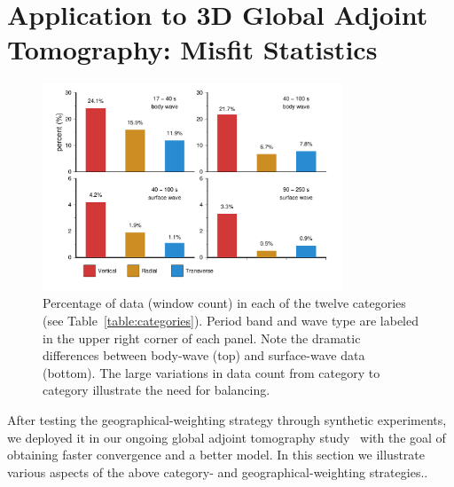 \section{Application to 3D Global Adjoint Tomography: Misfit Statistics}

\begin{figure}
\centering
\includegraphics[width=0.8\textwidth]{ch-weighting/figures/category_wincount_contribution.pdf}
\caption{\small{Percentage of data (window count) in each of the twelve categories (see Table~\ref{table:categories}).
Period band and wave type are  labeled in the upper right corner of each panel.
Note the dramatic differences between  
body-wave (top) and surface-wave data (bottom). 
The large variations in data count from category to category illustrate the 
need for balancing.
}}
\label{fig:wcounts_contribution}
\end{figure}

After testing the geographical-weighting strategy through synthetic experiments,
we deployed it in our ongoing
global adjoint tomography study~\cite{Lei2018} with the goal of obtaining faster convergence and a 
better model. In this section we illustrate various aspects of the above category- and geographical-weighting
strategies.. 

